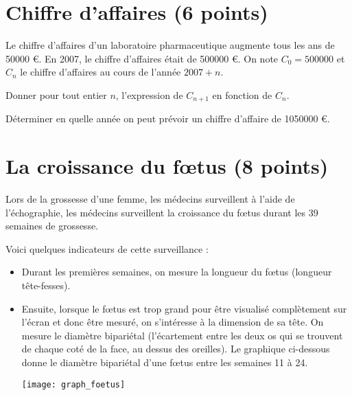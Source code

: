 \documentclass[a4paper,11pt]{exam}
\begin{document}
\section{Chiffre d'affaires (6 points)}

Le chiffre d'affaires d'un laboratoire pharmaceutique augmente tous les ans de \num{50000} €.
En 2007, le chiffre d'affaires était de \num{500000} €. On note $C_0 = \num{500000}$ et $C_n$ le chiffre d'affaires au cours de l'année $2007 + n$.

\begin{questions}
	\question[1] Donner pour tout entier $n$, l'expression de $C_{n+1}$ en fonction de $C_n$.
	\question[3] 
	
	\question[2] Déterminer en quelle année on peut prévoir un chiffre d'affaire de \num{1050000} €.
	
\end{questions}

\section{La croissance du f\oe tus (8 points)}

Lors de la grossesse d'une femme, les médecins surveillent à l'aide de l'échographie, les médecins surveillent la croissance du f\oe tus durant les 39 semaines de grossesse.

Voici quelques indicateurs de cette surveillance :
\begin{itemize}
	\item Durant les premières semaines, on mesure la longueur du f\oe tus (longueur tête-fesses).
	\item Ensuite, lorsque le f\oe tus est trop grand pour être visualisé complètement sur l'écran et donc être mesuré, on s'intéresse à la dimension de sa tête. On mesure le diamètre bipariétal (l'écartement entre les deux os qui se trouvent de chaque coté de la face, au dessus des oreilles). Le graphique ci-dessous donne le diamètre bipariétal d'une f\oe tus entre les semaines 11 à 24.
	
	\begin{center}
		\texttt{[image: graph\_foetus]}
	\end{center}

\end{itemize}
\end{document}
